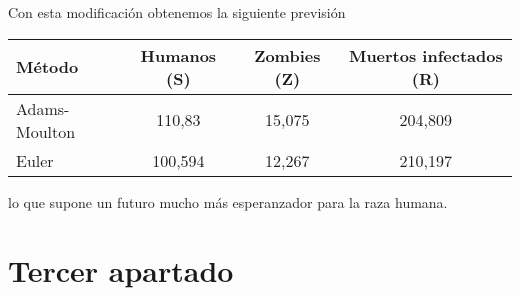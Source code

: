 \documentclass[nochap]{apuntes}
\begin{document}
Con esta modificación obtenemos la siguiente previsión

\begin{center}
\begin{tabular}{lccc}    \toprule
Método    & Humanos (S)  & Zombies (Z)  & Muertos infectados (R)  \\ \midrule
Adams-Moulton & 110,83 & 15,075 & 204,809\\ 
Euler & 100,594 & 12,267 & 210,197\\\bottomrule
 \hline
\end{tabular}
\end{center}

lo que supone un futuro mucho más esperanzador para la raza humana.

\section{Tercer apartado}
\end{document}
